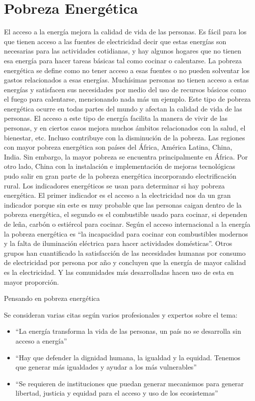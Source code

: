 \documentclass{article}
\begin{document}
\section{Pobreza Energética}
El acceso a la energía mejora la calidad de vida de las personas. Es fácil para los que tienen acceso a las fuentes de electricidad decir que estas energías son necesarias para las actividades cotidianas, y hay algunos hogares que no tienen esa energía para hacer tareas básicas tal como cocinar o calentarse. La pobreza energética se define como no tener acceso a esas fuentes o no pueden solventar los gastos relacionados a esas energías. Muchísimas personas no tienen acceso a estas energías y satisfacen sus necesidades por medio del uso de recursos básicos como el fuego para calentarse, mencionando nada más un ejemplo. Este tipo de pobreza energética ocurre en todas partes del mundo y afectan la calidad de vida de las personas. El acceso a este tipo de energía facilita la manera de vivir de las personas, y en ciertos casos mejora muchos ámbitos relacionados con la salud, el bienestar, etc. Incluso contribuye con la disminución de la pobreza. Las regiones con mayor pobreza energética son países del África, América Latina, China, India. Sin embargo, la mayor pobreza se encuentra principalmente en África. Por otro lado, China con la instalación e implementación de mejoras tecnológicas pudo salir en gran parte de la pobreza energética incorporando electrificación rural.
Los indicadores energéticos se usan para determinar si hay pobreza energética. El primer indicador es el acceso a la electricidad nos da un gran indicador porque sin este es muy probable que las personas caigan dentro de la pobreza energética, el segundo es el combustible usado para cocinar, si dependen de leña, carbón o estiércol para cocinar.
Según el acceso internacional a la energía la pobreza energética es “la incapacidad para cocinar con combustibles modernos y la falta de iluminación eléctrica para hacer actividades domésticas”. Otros grupos han cuantificado la satisfacción de las necesidades humanas por consumo de electricidad por persona por año y concluyen que la energía de mayor calidad es la electricidad. Y las comunidades más desarrolladas hacen uso de esta en mayor proporción.

\begin{footnotesize}
\footnotesize{Pensando en pobreza energética}\\
\footnotesize{Se consideran varias citas según varios profesionales y expertos sobre el tema:
 \begin{itemize}
\item“La energía transforma la vida de las personas, un país no se desarrolla sin acceso a energía”
\item“Hay que defender la dignidad humana, la igualdad y la equidad. Tenemos que generar más igualdades y ayudar a los más vulnerables”
\item“Se requieren de instituciones que puedan generar mecanismos para generar libertad, justicia y equidad para el acceso y uso de los ecosistemas”
\end{itemize}}
\end{footnotesize}
\end{document}
